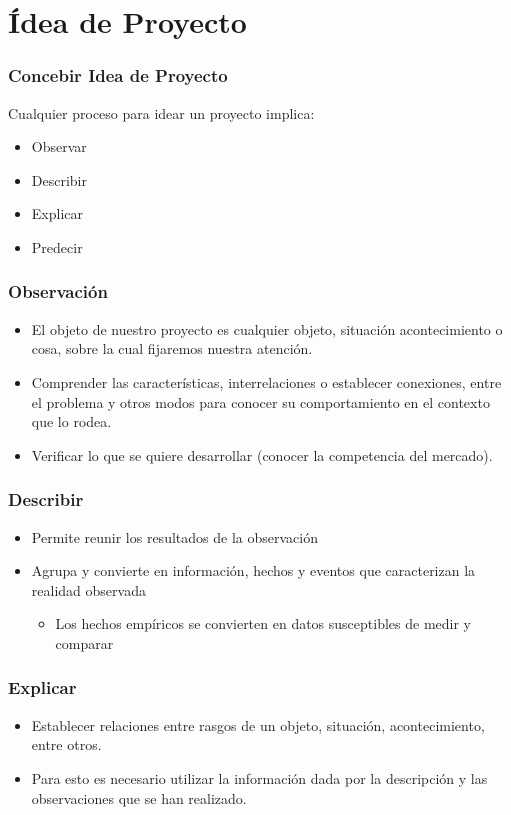 \documentclass[aspectratio=169]{beamer}%
\newcommand\rojo[1]{\textcolor[RGB]{237,41,57}{#1}}
\begin{document}
\section{Ídea de Proyecto}


\begin{frame}[fragile]
\frametitle{\textbf{Concebir Idea de Proyecto}}
\justifying
Cualquier proceso para idear un proyecto implica:
\begin{itemize}
 \item Observar
 \item Describir
 \item Explicar
 \item Predecir
\end{itemize}
\end{frame}

\begin{frame}[fragile]
\frametitle{\textbf{Observación}}
\justifying
\begin{itemize}
 \item El \rojo{objeto de nuestro proyecto} es cualquier objeto, situación acontecimiento o cosa, sobre la cual fijaremos nuestra atención.
 \item Comprender las características, interrelaciones o establecer conexiones, entre el problema y otros modos para conocer su comportamiento en el contexto que lo rodea.
 \item Verificar lo que se quiere desarrollar (conocer la competencia del mercado).
\end{itemize}
\end{frame}

\begin{frame}[fragile]
\frametitle{\textbf{Describir}}
\justifying
\begin{itemize}
 \item Permite \rojo{reunir los resultados de la observación}
 \item Agrupa y convierte en información, hechos y eventos que caracterizan la realidad observada
 \begin{itemize}
  \item Los hechos empíricos se convierten en datos susceptibles de medir y comparar
 \end{itemize}
\end{itemize}
\end{frame}

\begin{frame}[fragile]
\frametitle{\textbf{Explicar}}
\justifying
\begin{itemize}
 \item Establecer relaciones entre rasgos de un objeto, situación, acontecimiento, entre otros.
 \item Para esto es necesario utilizar la información dada por la descripción y las observaciones que se han realizado.
\end{itemize}
\end{frame}
\end{document}
